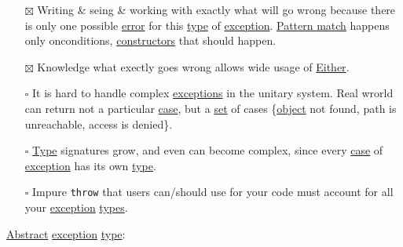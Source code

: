 \documentclass[a4paper,14pt,oneside]{book}
\begin{document}
\begin{itemize}
\item[{$\boxtimes$}] Writing \& seing \& working with exactly what will go wrong because there is only one possible \hyperref[orgdbf9386]{error} for this \hyperref[org38dea24]{type} of \hyperref[org3882403]{exception}. \hyperref[org3f40173]{Pattern match} happens only onconditions, \hyperref[org68913c7]{constructors} that should happen.\\
\item[{$\boxtimes$}] Knowledge what exectly goes wrong allows wide usage of \hyperref[org7c5db10]{Either}.\\
\item[{$\square$}] It is hard to handle complex \hyperref[org99ba80b]{exceptions} in the unitary system. Real wrorld can return not a particular \hyperref[orgdf7fd66]{case}, but a \hyperref[org6f8bfa6]{set} of cases \{\hyperref[orged362a8]{object} not found, path is unreachable, access is denied\}.\\
\item[{$\square$}] \hyperref[org38dea24]{Type} signatures grow, and even can become complex, since every \hyperref[orgdf7fd66]{case} of \hyperref[org3882403]{exception} has its own \hyperref[org38dea24]{type}.\\
\item[{$\square$}] Impure \texttt{throw} that users can/should use for your code must account for all your \hyperref[org3882403]{exception} \hyperref[orgb6d8f90]{types}.\\
\end{itemize}

\hyperref[orgee361eb]{Abstract} \hyperref[org3882403]{exception} \hyperref[org38dea24]{type}:\\
\end{document}
